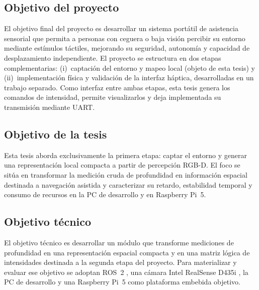 \subsection{Objetivo del proyecto}

El objetivo final del proyecto es desarrollar un sistema portátil de asistencia sensorial que
permita a personas con ceguera o baja visión percibir su entorno mediante estímulos táctiles,
mejorando su seguridad, autonomía y capacidad de desplazamiento independiente.
El proyecto se estructura en dos etapas complementarias:
(i)~captación del entorno y mapeo local (objeto de esta tesis) y
(ii)~implementación física y validación de la interfaz háptica, desarrolladas en un trabajo
separado. Como interfaz entre ambas etapas, esta tesis genera los comandos de intensidad, permite
visualizarlos y deja implementada su transmisión mediante UART.

\subsection{Objetivo de la tesis}

Esta tesis aborda exclusivamente la primera etapa: captar el entorno y generar una representación
local compacta a partir de percepción RGB-D. El foco se sitúa en transformar la medición cruda de
profundidad en información espacial destinada a navegación asistida y caracterizar su retardo,
estabilidad temporal y consumo de recursos en la PC de desarrollo y en Raspberry Pi~5.

\subsection{Objetivo técnico}
\label{sec:intro-objetivo-tecnico}

El objetivo técnico es desarrollar un módulo que transforme mediciones de profundidad en una
representación espacial compacta y en una matriz lógica de intensidades destinada a la segunda
etapa del proyecto. Para materializar y evaluar ese objetivo se adoptan ROS~2 \cite{ROS}, una cámara
Intel RealSense D435i \cite{RS-D400}, la PC de desarrollo y una Raspberry Pi~5 como
plataforma embebida objetivo.

